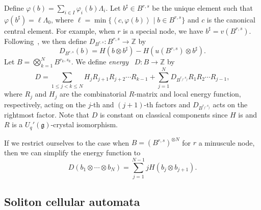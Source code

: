 \documentclass[reqno]{amsart}
\newcommand{\g}{\mathfrak{g}}
\newcommand{\inner}[2]{\left\langle #1, #2 \right\rangle}
\newcommand{\ZZ}{\mathbb{Z}}
\newcommand{\defn}[1]{{\color{darkred}\emph{#1}}} %
\theoremstyle{plain}
\theoremstyle{definition}
\numberwithin{equation}{section}
\begin{document}
Define $\varphi(b) = \sum_{i \in I} \varphi_i(b) \Lambda_i$.
Let $b^{\sharp} \in B^{r,s}$ be the unique element such that $\varphi(b^{\sharp}) = \ell \Lambda_0$, where $\ell = \min \{ \inner{c}{\varphi(b)} \mid b \in B^{r,s} \}$ and $c$ is the canonical central element.
For example, when $r$ is a special node, we have $b^{\sharp} = v(B^{r,s})$.
Following~\cite{HKOTT02}, we then define $D_{B^{r,s}} \colon B^{r,s} \to \ZZ$ by
\[
D_{B^{r,s}}(b) = H(b \otimes b^{\sharp}) - H(u(B^{r,s}) \otimes b^{\sharp}).
\]
Let $B = \bigotimes_{k=1}^N B^{r_k,s_k}$. We define \defn{energy}~\cite{HKOTY99} $D \colon B \to \ZZ$ by
\begin{equation}
\label{eq:energy_function}
D = \sum_{1 \leq j < k \leq N} H_j R_{j+1} R_{j+2} \cdots R_{k-1} + \sum_{j=1}^N D_{B^{r_j,s_j}} R_1 R_2 \cdots R_{j-1},
\end{equation}
where $R_j$ and $H_j$ are the combinatorial $R$-matrix and local energy function, respectively, acting on the $j$-th and $(j+1)$-th factors and $D_{B^{r_j,s_j}}$ acts on the rightmost factor. Note that $D$ is constant on classical components since $H$ is and $R$ is a $U_q'(\g)$-crystal isomorphism.

If we restrict ourselves to the case when $B = (B^{r,s})^{\otimes N}$ for $r$ a minuscule node, then we can simplify the energy function to
\begin{equation}
\label{eq:energy_function_simple}
D(b_1 \otimes \cdots \otimes b_N) = \sum_{j=1}^{N-1} j H(b_j \otimes b_{j+1}).
\end{equation}


\subsection{Soliton cellular automata}
\end{document}

